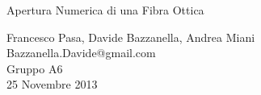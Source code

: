\begin{center}

     	{\huge Apertura Numerica di una Fibra Ottica}
	\vspace{0.5cm}

      	{\large Francesco Pasa, Davide Bazzanella, Andrea Miani} \\
      	{Bazzanella.Davide@gmail.com} \\
		{\large Gruppo A6} \\
	
	\vspace{0.3cm}
      	{\large 25 Novembre 2013}

\end{center}
